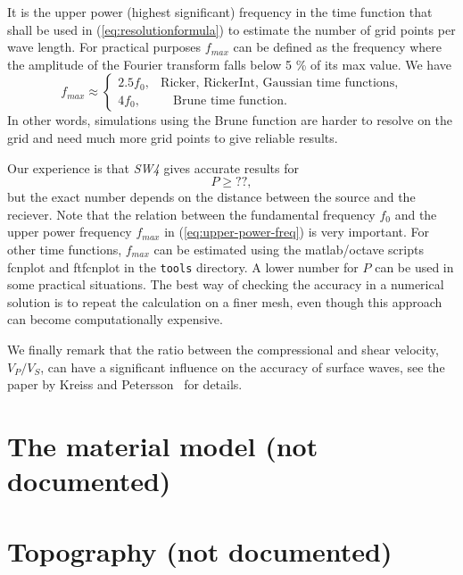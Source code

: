 \documentclass[11pt]{report}
\begin{document}
It is the upper power (highest significant) frequency in the time function that shall be used in
(\ref{eq:resolutionformula}) to estimate the number of grid points per wave length. For practical
purposes $f_{max}$ can be defined as the frequency where the amplitude of the Fourier
transform falls below 5 \% of its max value. We have
\begin{equation}\label{eq:upper-power-freq}
f_{max} \approx \begin{cases}2.5 f_0,&\mbox{Ricker, RickerInt, Gaussian time functions},\\
  4 f_0,&\quad\mbox{Brune time function}.
\end{cases}
\end{equation}
In other words, simulations using the Brune function are harder to resolve on the grid and need much
more grid points to give reliable results.

Our experience is that \emph{SW4} gives accurate results for 
\[
P \geq ??,
\]
but the exact number depends on the distance between the source and the reciever. Note that the
relation between the fundamental frequency $f_0$ and the upper power frequency $f_{max}$ in
(\ref{eq:upper-power-freq}) is very important. For other time functions, $f_{max}$ can be estimated
using the matlab/octave scripts fcnplot and ftfcnplot in the {\tt tools} directory. A lower number
for $P$ can be used in some practical situations. The best way of checking the accuracy in
a numerical solution is to repeat the calculation on a finer mesh, even though this approach
can become computationally expensive. 

We finally remark that the ratio between the compressional and shear velocity, $V_P/V_S$, can have a
significant influence on the accuracy of surface waves, see the paper by Kreiss and
Petersson~\cite{KrePet-12} for details.


\chapter{The material model (not documented)} \label{sec:material}

\chapter{Topography (not documented)} \label{sec:topography}

\end{document}

